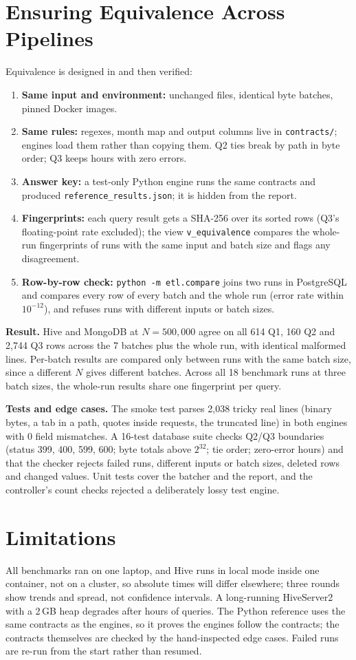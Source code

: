 \documentclass[conference]{IEEEtran}
\newcommand{\code}[1]{\texttt{\small #1}}
\begin{document}
\section{Ensuring Equivalence Across Pipelines}
Equivalence is designed in and then verified:
\begin{enumerate}
\item \textbf{Same input and environment:} unchanged files, identical byte batches, pinned
Docker images.
\item \textbf{Same rules:} regexes, month map and output columns live in \code{contracts/};
engines load them rather than copying them. Q2 ties break by path in byte order; Q3 keeps
hours with zero errors.
\item \textbf{Answer key:} a test-only Python engine runs the same contracts and produced
\code{reference\_results.json}; it is hidden from the report.
\item \textbf{Fingerprints:} each query result gets a SHA-256 over its sorted rows (Q3's
floating-point rate excluded); the view \code{v\_equivalence} compares the whole-run
fingerprints of runs with the same input and batch size and flags any disagreement.
\item \textbf{Row-by-row check:} \code{python -m etl.compare} joins two runs in PostgreSQL and
compares every row of every batch and the whole run (error rate within $10^{-12}$), and refuses
runs with different inputs or batch sizes.
\end{enumerate}
\textbf{Result.} Hive and MongoDB at $N=500{,}000$ agree on all 614 Q1, 160 Q2 and 2,744 Q3
rows across the 7 batches plus the whole run, with identical malformed lines. Per-batch
results are compared only between runs with the same batch size, since a different $N$ gives
different batches. Across all 18 benchmark runs at three batch sizes, the whole-run results
share one fingerprint per query.

\textbf{Tests and edge cases.} The smoke test parses 2,038 tricky real lines (binary bytes, a
tab in a path, quotes inside requests, the truncated line) in both engines with 0 field
mismatches. A 16-test database suite checks Q2/Q3 boundaries (status 399, 400, 599, 600;
byte totals above $2^{32}$; tie order; zero-error hours) and that the checker rejects failed
runs, different inputs or batch sizes, deleted rows and changed values. Unit tests cover the
batcher and the report, and the controller's count checks rejected a deliberately lossy test
engine.

\section{Limitations}
All benchmarks ran on one laptop, and Hive runs in local mode inside one container, not on a
cluster, so absolute times will differ elsewhere; three rounds show trends and spread, not
confidence intervals. A long-running HiveServer2 with a 2\,GB heap degrades after hours of
queries. The Python reference uses the same contracts as the engines, so it proves the
engines follow the contracts; the contracts themselves are checked by the hand-inspected
edge cases. Failed runs are re-run from the start rather than resumed.
\end{document}
